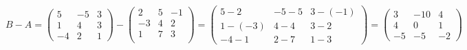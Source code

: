 \documentclass[fleqn]{article}
\begin{document}
\begin{enumerate}
\noindent
$B-A=
\begin{pmatrix}
  5 & -5 & 3 \\
  1 & 4 & 3 \\
  -4 & 2 & 1
\end{pmatrix}
-
\begin{pmatrix}
  2 & 5 & -1 \\
  -3 & 4 & 2 \\ 
  1 & 7 & 3 \\ 
\end{pmatrix}
=
\begin{pmatrix}
  5-2 & -5-5 & 3-(-1) \\
  1-(-3) & 4-4 & 3-2 \\
  -4-1 & 2-7 & 1-3
\end{pmatrix}
=
\begin{pmatrix}
  3 & -10 & 4 \\
  4 & 0 & 1 \\
  -5 & -5 & -2
\end{pmatrix}
$



\end{enumerate}
\end{document}
